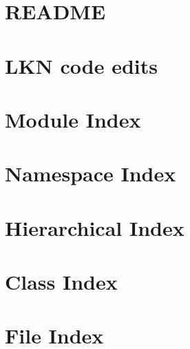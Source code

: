 \documentclass[twoside]{book}
\newcommand{\+}{\discretionary{\mbox{\scriptsize$\hookleftarrow$}}{}{}}
\begin{document}
\chapter{R\+E\+A\+D\+ME}
\label{md__home_lkn_off_cloud__smartgrid-code__git_hub_openwsn-fw_site_scons__r_e_a_d_m_e}
\hypertarget{md__home_lkn_off_cloud__smartgrid-code__git_hub_openwsn-fw_site_scons__r_e_a_d_m_e}{}

\chapter{L\+KN code edits}
\label{_l_k_n_code_edits}
\hypertarget{_l_k_n_code_edits}{}

\chapter{Module Index}

\chapter{Namespace Index}

\chapter{Hierarchical Index}

\chapter{Class Index}

\chapter{File Index}

\end{document}
